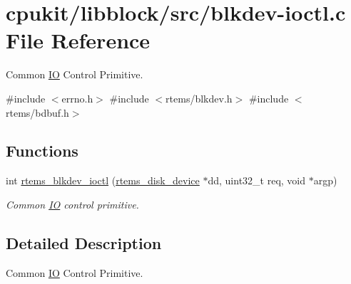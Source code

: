 \hypertarget{blkdev-ioctl_8c}{}\section{cpukit/libblock/src/blkdev-\/ioctl.c File Reference}
\label{blkdev-ioctl_8c}


Common \mbox{\hyperlink{structIO}{IO}} Control Primitive.  


{\ttfamily \#include $<$errno.\+h$>$}\newline
{\ttfamily \#include $<$rtems/blkdev.\+h$>$}\newline
{\ttfamily \#include $<$rtems/bdbuf.\+h$>$}\newline
\subsection*{Functions}
\begin{DoxyCompactItemize}
\item 
int \mbox{\hyperlink{group__rtems__blkdev_gab555c151c08cc5ec60ccea5d24052d23}{rtems\+\_\+blkdev\+\_\+ioctl}} (\mbox{\hyperlink{structrtems__disk__device}{rtems\+\_\+disk\+\_\+device}} $\ast$dd, uint32\+\_\+t req, void $\ast$argp)
\begin{DoxyCompactList}\small\item\em Common \mbox{\hyperlink{structIO}{IO}} control primitive. \end{DoxyCompactList}\end{DoxyCompactItemize}


\subsection{Detailed Description}
Common \mbox{\hyperlink{structIO}{IO}} Control Primitive. 


